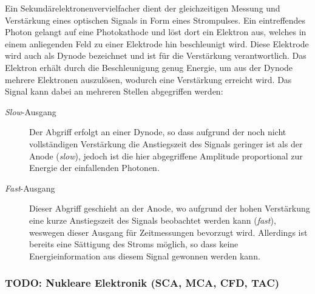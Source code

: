 \documentclass[11pt, a4paper]{article}
\numberwithin{equation}{section}
\begin{document}
Ein Sekundärelektronenvervielfacher dient der gleichzeitigen Messung und Verstärkung eines optischen Signals in Form eines Strompulses.
Ein eintreffendes Photon gelangt auf eine Photokathode und löst dort ein Elektron aus, welches in einem anliegenden Feld zu einer Elektrode hin beschleunigt wird.
Diese Elektrode wird auch als Dynode bezeichnet und ist für die Verstärkung verantwortlich.
Das Elektron erhält durch die Beschleunigung genug Energie, um aus der Dynode mehrere Elektronen auszulösen, wodurch eine Verstärkung erreicht wird.
Das Signal kann dabei an mehreren Stellen abgegriffen werden:
\begin{description}
	\item[\textit{Slow}-Ausgang]Der Abgriff erfolgt an einer Dynode, so dass aufgrund der noch nicht vollständigen Verstärkung die Anstiegszeit des Signals geringer ist als der Anode (\textit{slow}), jedoch ist die hier abgegriffene Amplitude proportional zur Energie der einfallenden Photonen.
	\item[\textit{Fast}-Ausgang]Dieser Abgriff geschieht an der Anode, wo aufgrund der hohen Verstärkung eine kurze Anstiegszeit des Signals beobachtet werden kann (\textit{fast}), weswegen dieser Ausgang für Zeitmessungen bevorzugt wird. Allerdings ist bereits eine Sättigung des Stroms möglich, so dass keine Energieinformation aus diesem Signal gewonnen werden kann.
\end{description}

\subsubsection{TODO: Nukleare Elektronik (SCA, MCA, CFD, TAC)}
\end{document}
